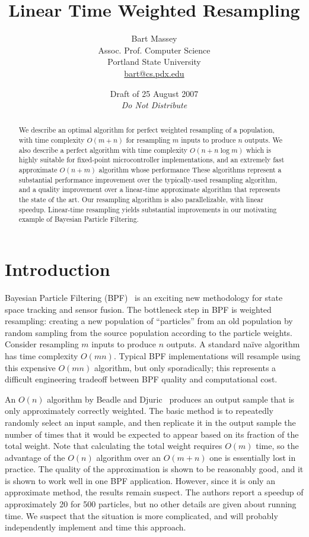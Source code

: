 \documentclass[12pt]{article}
\title{Linear Time Weighted Resampling}
\author{Bart Massey\\
  Assoc. Prof. Computer Science\\
  Portland State University\\
  \url{bart@cs.pdx.edu}}
\date{Draft of 25 August 2007\\{\em Do Not Distribute}}
\begin{document}
  \maketitle

  \begin{abstract}
  We describe an optimal algorithm for perfect weighted
  resampling of a population, with time complexity $O(m +
  n)$ for resampling $m$ inputs to produce $n$ outputs.
  We also describe a perfect algorithm with time complexity
  $O(n + n \log m)$ which is highly suitable for fixed-point
  microcontroller implementations, and an extremely fast
  approximate $O(n + m)$ algorithm whose performance 
  These algorithms represent a substantial performance improvement over
  the typically-used resampling algorithm, and a quality
  improvement over a linear-time approximate algorithm
  that represents the state of the art.  Our resampling
  algorithm is also parallelizable, with linear
  speedup.  Linear-time resampling yields substantial
  improvements in our motivating example of Bayesian
  Particle Filtering.
  \end{abstract}

\section{Introduction}

  Bayesian Particle Filtering (BPF)~\cite{bpf} is an
  exciting new methodology for state space tracking and
  sensor fusion.  The bottleneck step in BPF is weighted
  resampling: creating a new population of ``particles''
  from an old population by random sampling from the source
  population according to the particle weights.  Consider
  resampling $m$ inputs to produce $n$ outputs.  A standard
  na\"ive algorithm has time complexity $O(mn)$.  Typical
  BPF implementations will resample using this expensive
  $O(mn)$ algorithm, but only sporadically; this represents
  a difficult engineering tradeoff between BPF quality and
  computational cost.

  An $O(n)$ algorithm by Beadle and Djuric~\cite{recount}
  produces an output sample that is only approximately
  correctly weighted.  The basic method is to repeatedly
  randomly select an input sample, and then replicate it in
  the output sample the number of times that it would be
  expected to appear based on its fraction of the total
  weight.  Note that calculating the total weight requires
  $O(m)$ time, so the advantage of the $O(n)$ algorithm over
  an $O(m + n)$ one is essentially lost in practice.  The
  quality of the approximation is shown to be reasonably
  good, and it is shown to work well in one BPF application.
  However, since it is only an approximate method, the
  results remain suspect.  The authors report a speedup of
  approximately 20 for 500 particles, but no other details
  are given about running time.  We suspect that the
  situation is more complicated, and will probably
  independently implement and time this approach.
\end{document}
